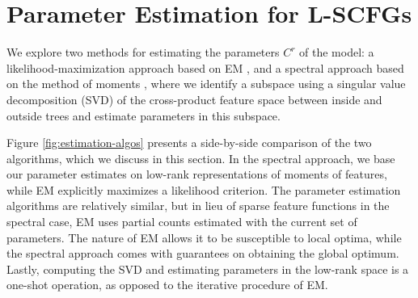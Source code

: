 \documentclass[11pt]{article}
\begin{document}
\section{Parameter Estimation for L-SCFGs}
\label{sec:estimation}
We explore two methods for estimating the parameters $C^r$ of the model: a likelihood-maximization approach based on EM \cite{Dempster1977}, and a spectral approach based on the method of moments \cite{Hsu2009,cohen-14b}, where we identify a subspace using a singular value decomposition (SVD) of the cross-product feature space between inside and outside trees and estimate parameters in this subspace. 

Figure \ref{fig:estimation-algos} presents a side-by-side comparison of the two algorithms, which we discuss in this section.  
In the spectral approach, we base our parameter estimates on low-rank representations of moments of features, while EM explicitly maximizes a likelihood criterion. 
The parameter estimation algorithms are relatively similar, but in lieu of sparse feature functions in the spectral case, EM uses partial counts estimated with the current set of parameters.  
The nature of EM allows it to be susceptible to local optima, while the spectral approach comes with guarantees on obtaining the global optimum. 
Lastly, computing the SVD and estimating parameters in the low-rank space is a one-shot operation, as opposed to the iterative procedure of EM. 
\end{document}
